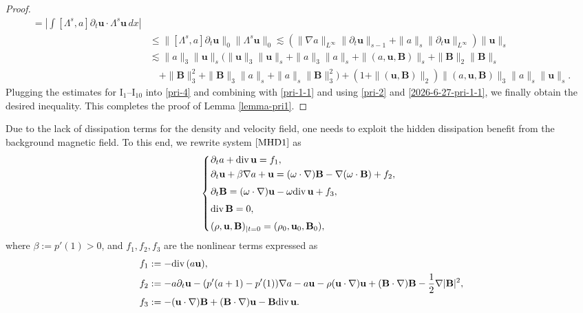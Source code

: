\documentclass[12pt, reqno]{amsart}
\numberwithin{equation}{section}
\numberwithin{equation}{section}
\def\div{ \hbox{\rm div}\,  }
\numberwithin{equation}{section}
\numberwithin{equation}{section}
\theoremstyle{remark}
\def\div{ \hbox{\rm div}\,  }
\def\u{ \mathbf{u} }
\def\b{ \mathbf{B} }
\begin{document}
\begin{proof}
\begin{equation*}
\begin{split}
=\left|\int[\Lambda^s,a]\partial_t\u\cdot\Lambda^s \u \,dx\right|\\
&\leq\|[\Lambda^s,a]\partial_t\u\|_0\|\Lambda^s \u\|_0\lesssim
(\|\nabla a\|_{L^\infty}\|\partial_t\u\|_{s-1}+\|a\|_s\|\partial_t\u\|_{L^\infty})\|\u\|_s\\
&\lesssim\|a\|_3\|\u\|_s\big(\|\u\|_3\|\u\|_s+\|a\|_3\|a\|_s+\|(a,\u,\b)\|_s+\|\b\|_2\|\b\|_{s}\\
&\quad+\|\b\|^{2}_3+\|\b\|_3\|a\|_s+\|a\|_s\|\b\|^{2}_3\big)+(1+\|(\u,\b)\|_2)\|(a,\u,\b)\|_3\|a\|_s\|\u\|_s.
\end{split}\end{equation*}
Plugging the estimates for $\textrm{I}_{1}$--$\textrm{I}_{10}$ into \eqref{pri-4} and  combining with \eqref{pri-1-1} and %
using \eqref{pri-2} and \eqref{2026-6-27-pri-1-1}, we finally obtain the desired inequality. This completes the proof of Lemma \ref{lemma-pri1}.
\end{proof}

Due to the lack of dissipation terms for the density and velocity field, one needs to
exploit the hidden dissipation benefit from the background magnetic
field. To this end, we rewrite system $\eqref{MHD1}$ as
\begin{equation}\label{MHD2}
\left\{
\begin{array}{rl}
&\hspace{-0,5cm}\partial_ta+\div \u=f_1,
\smallskip\\
&\hspace{-0,5cm}\partial_t \u
+\beta\nabla a +\u=(\omega\cdot \nabla) \b-\nabla(\omega\cdot  \b)+f_2,
\medskip\\
&\hspace{-0,5cm}\partial_t  \b
=(\omega\cdot \nabla)\u-\omega\div \u+f_3,
\medskip\\
&\hspace{-0,5cm}{\mathop{\rm div}}\, \b=0,
\medskip\\
&\hspace{-0,5cm}(\rho,\u, \b)_{|t=0}=(\rho_0,\u_0, \b_0),
\end{array}
\right.
\end{equation}
where $\beta:=p'(1)>0$, and $f_1,f_2,f_3$ are the nonlinear terms expressed as
\begin{equation*}\begin{split}
&f_1:=-\div (a \u),\\
&f_2:=-a\partial_t\u-(p'(a+1)-p'(1))\nabla a-a\u-\rho(\u\cdot\nabla)\u+( \b\cdot\nabla) \b-\frac{1}{2}\nabla|\b|^2,\\
&f_3:=-(\u\cdot\nabla) \b+( \b\cdot\nabla)\u- \b\div \u.
\end{split}\end{equation*}
\end{document}

